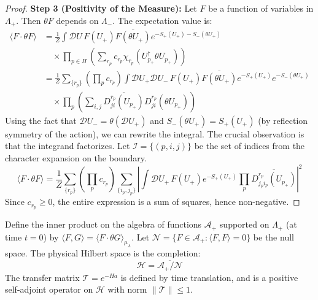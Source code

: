 \begin{proof}
\textbf{Step 3 (Positivity of the Measure):}
Let $F$ be a function of variables in $\Lambda_+$. Then $\theta F$ depends on $\Lambda_-$. The expectation value is:
\begin{align}
\langle F \cdot \theta F \rangle &= \frac{1}{Z} \int \mathcal{D}U \, F(U_+) \overline{F(\theta U_+)} e^{-S_+(U_+) - S_-(\theta U_+)} \nonumber \\
&\quad \times \prod_{p \in \Pi} \left( \sum_{r_p} c_{r_p} \chi_{r_p}(U_{p_+}^\dagger \theta U_{p_+}) \right) \\
&= \frac{1}{Z} \sum_{\{r_p\}} \left( \prod_p c_{r_p} \right) \int \mathcal{D}U_+ \mathcal{D}U_- \, F(U_+) \overline{F(\theta U_+)} e^{-S_+(U_+)} e^{-S_-(\theta U_+)} \nonumber \\
&\quad \times \prod_p \left( \sum_{i,j} \overline{D_{ji}^{r_p}(U_{p_+})} D_{ji}^{r_p}(\theta U_{p_+}) \right)
\end{align}
Using the fact that $\mathcal{D}U_- = \theta(\mathcal{D}U_+)$ and $S_-(\theta U_+) = S_+(U_+)$ (by reflection symmetry of the action), we can rewrite the integral. The crucial observation is that the integrand factorizes.
Let $\mathcal{I} = \{ (p, i, j) \}$ be the set of indices from the character expansion on the boundary.
\begin{equation}
\langle F \cdot \theta F \rangle = \frac{1}{Z} \sum_{\{r_p\}} \left( \prod_p c_{r_p} \right) \sum_{\{i_p, j_p\}} \left| \int \mathcal{D}U_+ \, F(U_+) e^{-S_+(U_+)} \prod_p \overline{D_{j_p i_p}^{r_p}(U_{p_+})} \right|^2
\end{equation}
Since $c_{r_p} \geq 0$, the entire expression is a sum of squares, hence non-negative.
\end{proof}

\begin{corollary}
Define the inner product on the algebra of functions $\mathcal{A}_+$ supported on $\Lambda_+$ (at time $t=0$) by $\langle F, G \rangle = \langle F \cdot \theta G \rangle_{\mu_\Lambda}$.
Let $\mathcal{N} = \{F \in \mathcal{A}_+ : \langle F, F \rangle = 0\}$ be the null space.
The physical Hilbert space is the completion:
\begin{equation}
\mathcal{H} = \overline{\mathcal{A}_+ / \mathcal{N}}
\end{equation}
The transfer matrix $\mathcal{T} = e^{-H a}$ is defined by time translation, and is a positive self-adjoint operator on $\mathcal{H}$ with norm $\|\mathcal{T}\| \leq 1$.
\end{corollary}

